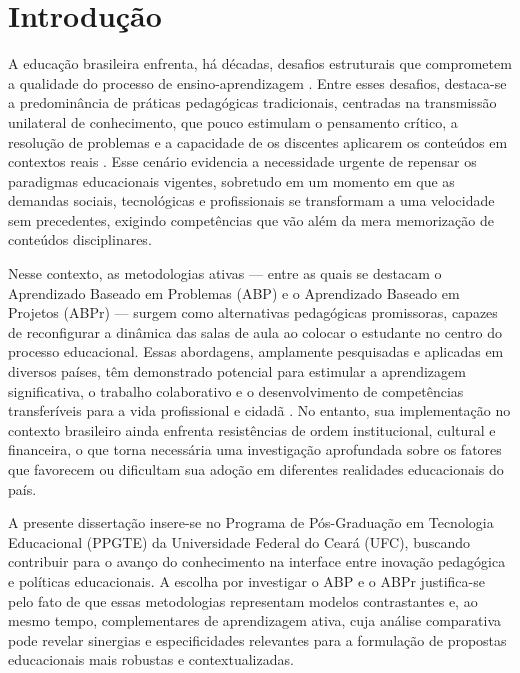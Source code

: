 
\chapter{Introdução}
\label{chap:introducao}

A educação brasileira enfrenta, há décadas, desafios estruturais que comprometem a qualidade do processo de ensino-aprendizagem \cite{BRASIL2018}. Entre esses desafios, destaca-se a predominância de práticas pedagógicas tradicionais, centradas na transmissão unilateral de conhecimento, que pouco estimulam o pensamento crítico, a resolução de problemas e a capacidade de os discentes aplicarem os conteúdos em contextos reais \cite{BACICH2018}. Esse cenário evidencia a necessidade urgente de repensar os paradigmas educacionais vigentes, sobretudo em um momento em que as demandas sociais, tecnológicas e profissionais se transformam a uma velocidade sem precedentes, exigindo competências que vão além da mera memorização de conteúdos disciplinares.

Nesse contexto, as metodologias ativas — entre as quais se destacam o Aprendizado Baseado em Problemas (ABP) e o Aprendizado Baseado em Projetos (ABPr) — surgem como alternativas pedagógicas promissoras, capazes de reconfigurar a dinâmica das salas de aula ao colocar o estudante no centro do processo educacional. Essas abordagens, amplamente pesquisadas e aplicadas em diversos países, têm demonstrado potencial para estimular a aprendizagem significativa, o trabalho colaborativo e o desenvolvimento de competências transferíveis para a vida profissional e cidadã \cite{BACICH2018}. No entanto, sua implementação no contexto brasileiro ainda enfrenta resistências de ordem institucional, cultural e financeira, o que torna necessária uma investigação aprofundada sobre os fatores que favorecem ou dificultam sua adoção em diferentes realidades educacionais do país.

A presente dissertação insere-se no Programa de Pós-Graduação em Tecnologia Educacional (PPGTE) da Universidade Federal do Ceará (UFC), buscando contribuir para o avanço do conhecimento na interface entre inovação pedagógica e políticas educacionais. A escolha por investigar o ABP e o ABPr justifica-se pelo fato de que essas metodologias representam modelos contrastantes e, ao mesmo tempo, complementares de aprendizagem ativa, cuja análise comparativa pode revelar sinergias e especificidades relevantes para a formulação de propostas educacionais mais robustas e contextualizadas.

